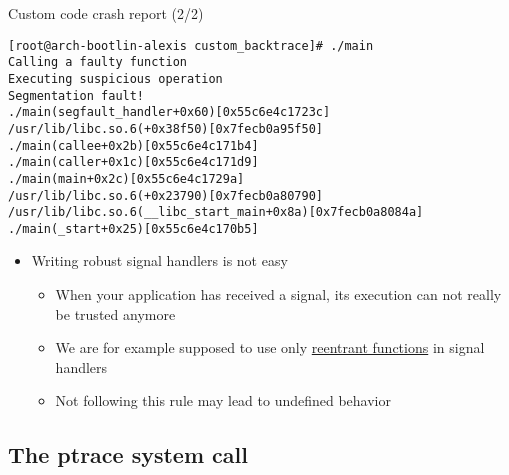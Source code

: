 \begin{frame}[fragile]{Custom code crash report (2/2)}
    \begin{block}{}
      \begin{verbatim}
[root@arch-bootlin-alexis custom_backtrace]# ./main
Calling a faulty function
Executing suspicious operation
Segmentation fault!
./main(segfault_handler+0x60)[0x55c6e4c1723c]
/usr/lib/libc.so.6(+0x38f50)[0x7fecb0a95f50]
./main(callee+0x2b)[0x55c6e4c171b4]
./main(caller+0x1c)[0x55c6e4c171d9]
./main(main+0x2c)[0x55c6e4c1729a]
/usr/lib/libc.so.6(+0x23790)[0x7fecb0a80790]
/usr/lib/libc.so.6(__libc_start_main+0x8a)[0x7fecb0a8084a]
./main(_start+0x25)[0x55c6e4c170b5]
      \end{verbatim}
    \end{block}
    \begin{itemize}
      \item Writing robust signal handlers is not easy
        \begin{itemize}
          \item When your application has received a  signal,
            its execution can not really be trusted anymore
          \item We are for example supposed to use only
            \href{https://man7.org/linux/man-pages/man7/signal-safety.7.html}{reentrant
            functions} in signal handlers
          \item Not following this rule may lead to undefined behavior
        \end{itemize}
    \end{itemize}
\end{frame}

\subsection{The ptrace system call}

